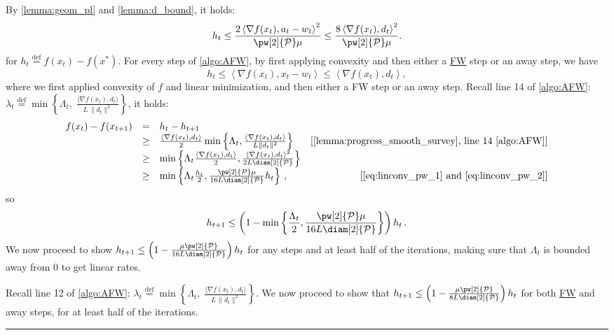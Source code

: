 \documentclass{article}
\newcommand{\jmlrBlackBox}{\rule{1.5ex}{1.5ex}}
\newcommand{\jmlrQED}{\hfill\jmlrBlackBox\par\bigskip}
\providecommand{\proofname}{Proof}
\renewenvironment{proof}%
{%
 \par\noindent{\bfseries\upshape \proofname\ }%
}%
{\jmlrQED}
\newcommand{\mP}{\mathcal{P}}
\newcommand{\innp}[1]{\left\langle #1 \right\rangle}
\newcommand{\defi}{\stackrel{\mathrm{\scriptscriptstyle def}}{=}}
\newcommand\newlink[2]{\hyperlink{#1}{\normalcolor #2}}
\newcommand{\FW}{\newlink{def:acronym_frank_wolfe}{FW}}
\begin{document}
\begin{proof}
By \cref{lemma:geom_pl} and \cref{lemma:d_bound}, it holds:
\begin{equation}\label{eq:linconv_pw_1}
h_t \le \frac{2\innp{\nabla f(x_t), a_t - w_t}^2}{\pw[2]{\mP}\mu} \le \frac{8\innp{\nabla f(x_t), d_t}^2}{\pw[2]{\mP}\mu}.
\end{equation}
for $h_t \defi f(x_t)-f(x^\ast)$. For every step of \cref{algo:AFW}, by first applying convexity and then either a \FW{} step or an away step, we have
\begin{equation}\label{eq:linconv_pw_2}
h_t \le \innp{\nabla f(x_t), x_t - w_t} \le \innp{\nabla f(x_t), d_t},
\end{equation}
where we first applied convexity of $f$ and linear minimization, and then either a FW step or an away step.
%
Recall line 14 of \cref{algo:AFW}: $\lambda_t \defi \min\left\{ \Lambda_t,\; \frac{\langle \nabla f(x_t), d_t \rangle}{L\,\|d_t\|^2} \right\}$, it holds:
\begin{equation}\label{eq:linconv_pw_3}
\begin{array}{rclr}
f(x_t) - f(x_{t+1}) &=& h_t - h_{t+1}\\
&\ge& \frac{\innp{\nabla f(x_t), d_t}}{2} \min \left\{ \Lambda_t, \frac{\innp{\nabla f(x_t), d_t}}{L\|d_t\|^2}\right\} &[\text{\cref{lemma:progress_smooth_survey}, line 14 \cref{algo:AFW}}]\\
%
&\ge & \min \left\{ \Lambda_t \frac{\innp{\nabla f(x_t), d_t}}{2}, \frac{\innp{\nabla f(x_t), d_t}^2}{2L\diam[2]{\mP}}\right\}&\\
%
&\ge & \min \left\{\Lambda_t \frac{h_t}{2}, \frac{\pw[2]{\mP}\mu}{16L\diam[2]{\mP}}h_t\right\}\,, & [\text{\cref{eq:linconv_pw_1} and \cref{eq:linconv_pw_2}}]
\end{array}
\end{equation}
so
\begin{equation}\label{eq:linconv_pw_4}
h_{t+1} \le \left(1 - \min \left\{\frac{\Lambda_t}{2}, \frac{\pw[2]{\mP}\mu}{16L\diam[2]{\mP}}\right\}\right)h_t\,.
\end{equation}
%
We now proceed to show $h_{t+1} \le \left(1 - \frac{\mu\pw[2]{\mP}}{16L\diam[2]{\mP}}\right)h_t$ for any steps and at least half of the iterations, making sure that $\Lambda_t$ is bounded away from 0 to get linear rates.

Recall line 12 of \cref{algo:AFW}: $\lambda_t \defi \min\left\{ \Lambda_t,\; \frac{\langle \nabla f(x_t), d_t \rangle}{L\,\|d_t\|^2} \right\}$.
We now proceed to show that $h_{t+1} \le \left(1 - \frac{\mu\pw[2]{\mP}}{8L\diam[2]{\mP}}\right)h_t$ for both \FW{} and away steps, for at least half of the iterations.


\end{proof}
\end{document}
